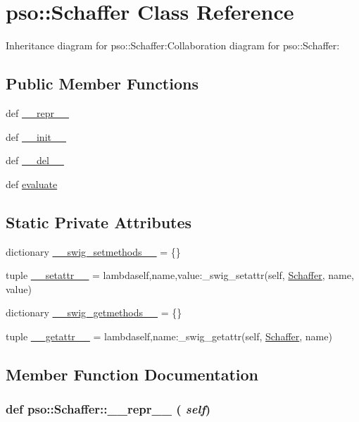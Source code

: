 \hypertarget{classpso_1_1Schaffer}{
\section{pso::Schaffer Class Reference}
\label{classpso_1_1Schaffer}
}
Inheritance diagram for pso::Schaffer:Collaboration diagram for pso::Schaffer:\subsection*{Public Member Functions}
\begin{CompactItemize}
\item 
def \hyperlink{classpso_1_1Schaffer_8b59b8cfafafad160fa0deac772d0191}{\_\-\_\-repr\_\-\_\-}
\item 
def \hyperlink{classpso_1_1Schaffer_ff9f1ae937ff0d73aeb17bb27be9b5f3}{\_\-\_\-init\_\-\_\-}
\item 
def \hyperlink{classpso_1_1Schaffer_a8c2032038b61e7a1f61f45ba0f86ccd}{\_\-\_\-del\_\-\_\-}
\item 
def \hyperlink{classpso_1_1Schaffer_575dd83cea9a359e9233918331ef4ada}{evaluate}
\end{CompactItemize}
\subsection*{Static Private Attributes}
\begin{CompactItemize}
\item 
dictionary \hyperlink{classpso_1_1Schaffer_b037f1ad69b6619f1f89c7ba8e5de505}{\_\-\_\-swig\_\-setmethods\_\-\_\-} = \{\}
\item 
tuple \hyperlink{classpso_1_1Schaffer_15fbb90f609e96f5533449e989908d5d}{\_\-\_\-setattr\_\-\_\-} = lambdaself,name,value:\_\-swig\_\-setattr(self, \hyperlink{classpso_1_1Schaffer}{Schaffer}, name, value)
\item 
dictionary \hyperlink{classpso_1_1Schaffer_3017db451e46ba369ce62cc2b7ee6dba}{\_\-\_\-swig\_\-getmethods\_\-\_\-} = \{\}
\item 
tuple \hyperlink{classpso_1_1Schaffer_98f17a1e02482e4ff12b9f886defc04f}{\_\-\_\-getattr\_\-\_\-} = lambdaself,name:\_\-swig\_\-getattr(self, \hyperlink{classpso_1_1Schaffer}{Schaffer}, name)
\end{CompactItemize}


\subsection{Member Function Documentation}
\hypertarget{classpso_1_1Schaffer_8b59b8cfafafad160fa0deac772d0191}{
\subsubsection{\setlength{\rightskip}{0pt plus 5cm}def pso::Schaffer::\_\-\_\-repr\_\-\_\- ( {\em self})}}
\label{classpso_1_1Schaffer_8b59b8cfafafad160fa0deac772d0191}




